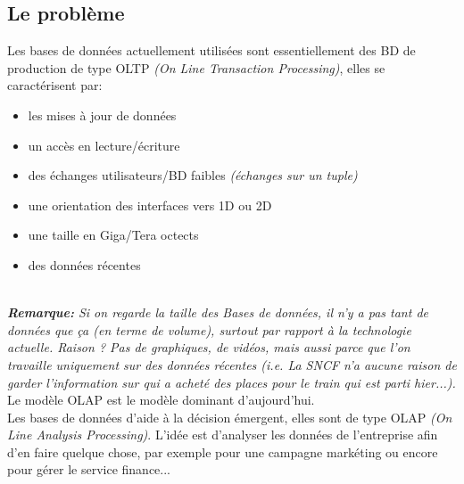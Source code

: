 \documentclass[a4paper,11pt]{article}
\begin{document}
\subsection{Le problème}
	Les bases de données actuellement utilisées sont essentiellement des BD de production de type OLTP \emph{(On Line Transaction Processing)}, elles se caractérisent par:
	\begin{itemize}
		\item les mises à jour de données 
		\item un accès en lecture/écriture
		\item des échanges utilisateurs/BD faibles \emph{(échanges sur un tuple)}
		\item une orientation des interfaces vers 1D ou 2D
		\item une taille en Giga/Tera octects
		\item des données récentes
	\end{itemize}
	~\\

\emph{\textbf{Remarque:} Si on regarde la taille des Bases de données, il n'y a pas tant de données que ça (en terme de volume), surtout par rapport à la technologie actuelle. Raison ? Pas de graphiques, de vidéos, mais aussi parce que l'on travaille uniquement sur des données récentes (i.e. La SNCF n'a aucune raison de garder l'information sur qui a acheté des places pour le train qui est parti hier...).}	\\
		
		Le modèle OLAP est le modèle dominant d'aujourd'hui. \\
		
		Les bases de données d'aide à la décision émergent, elles sont de type OLAP \emph{(On Line Analysis Processing)}. L'idée est d'analyser les données de l'entreprise afin d'en faire quelque chose, par exemple pour une campagne markéting ou encore pour gérer le service finance...\\ 
		
\end{document}

